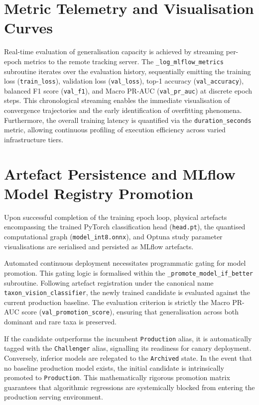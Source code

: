 \section{Metric Telemetry and Visualisation Curves}
\label{sec:metric_telemetry}
Real-time evaluation of generalisation capacity is achieved by streaming per-epoch metrics to the remote tracking server. The \texttt{\_log\_mlflow\_metrics} subroutine iterates over the evaluation history, sequentially emitting the training loss (\texttt{train\_loss}), validation loss (\texttt{val\_loss}), top-1 accuracy (\texttt{val\_accuracy}), balanced F1 score (\texttt{val\_f1}), and Macro PR-AUC (\texttt{val\_pr\_auc}) at discrete epoch steps. This chronological streaming enables the immediate visualisation of convergence trajectories and the early identification of overfitting phenomena. Furthermore, the overall training latency is quantified via the \texttt{duration\_seconds} metric, allowing continuous profiling of execution efficiency across varied infrastructure tiers.

\section{Artefact Persistence and MLflow Model Registry Promotion}
\label{sec:model_promotion}
Upon successful completion of the training epoch loop, physical artefacts encompassing the trained PyTorch classification head (\texttt{head.pt}), the quantised computational graph (\texttt{model\_int8.onnx}), and Optuna study parameter visualisations are serialised and persisted as MLflow artefacts.

Automated continuous deployment necessitates programmatic gating for model promotion. This gating logic is formalised within the \texttt{\_promote\_model\_if\_better} subroutine. Following artefact registration under the canonical name \texttt{taxon\_vision\_classifier}, the newly trained candidate is evaluated against the current production baseline. The evaluation criterion is strictly the Macro PR-AUC score (\texttt{val\_promotion\_score}), ensuring that generalisation across both dominant and rare taxa is preserved.

If the candidate outperforms the incumbent \texttt{Production} alias, it is automatically tagged with the \texttt{Challenger} alias, signalling its readiness for canary deployment. Conversely, inferior models are relegated to the \texttt{Archived} state. In the event that no baseline production model exists, the initial candidate is intrinsically promoted to \texttt{Production}. This mathematically rigorous promotion matrix guarantees that algorithmic regressions are systemically blocked from entering the production serving environment.
